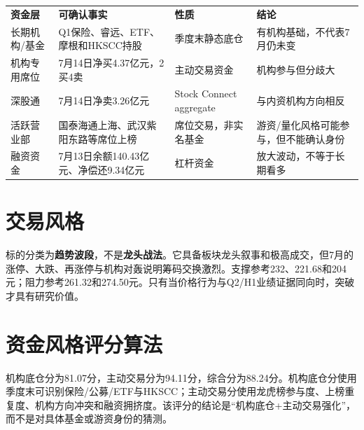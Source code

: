 \begin{exhibitbox}
\begin{tabularx}{\exhibitboxwidth}{L{3.0cm}X L{3.0cm}X}
\textbf{资金层} & \textbf{可确认事实} & \textbf{性质} & \textbf{结论} \\
长期机构/基金 & Q1保险、睿远、ETF、摩根和HKSCC持股 & 季度末静态底仓 & 有机构基础，不代表7月仍未变 \\
机构专用席位 & 7月14日净买4.37亿元，2买4卖 & 主动交易资金 & 机构参与但分歧大 \\
深股通 & 7月14日净卖3.26亿元 & Stock Connect aggregate & 与内资机构方向相反 \\
活跃营业部 & 国泰海通上海、武汉紫阳东路等席位上榜 & 席位交易，非实名基金 & 游资/量化风格可能参与，但不能确认身份 \\
融资资金 & 7月13日余额140.43亿元、净偿还9.34亿元 & 杠杆资金 & 放大波动，不等于长期看多 \\
\end{tabularx}
\end{exhibitbox}

\section{交易风格}
标的分类为\textbf{趋势波段}，不是\textbf{龙头战法}。它具备板块龙头叙事和极高成交，但7月的涨停、大跌、再涨停与机构对轰说明筹码交换激烈。支撑参考232、221.68和204元；阻力参考261.32和274.50元。只有当价格行为与Q2/H1业绩证据同向时，突破才具有研究价值。


\section{资金风格评分算法}
机构底仓分为81.07分，主动交易分为94.11分，综合分为88.24分。机构底仓分使用季度末可识别保险/公募/ETF与HKSCC；主动交易分使用龙虎榜参与度、上榜重复度、机构方向冲突和融资拥挤度。该评分的结论是“机构底仓+主动交易强化”，而不是对具体基金或游资身份的猜测。
